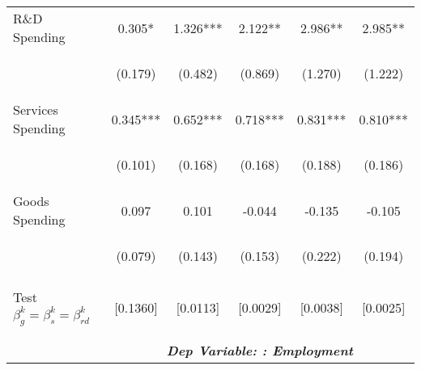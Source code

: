 \begin{tabular}{lccccc}
    R\&D Spending & 0.305* & 1.326*** & 2.122** & 2.986** & 2.985** \\
     & \begin{footnotesize}(0.179)\end{footnotesize} & \begin{footnotesize}(0.482)\end{footnotesize} & \begin{footnotesize}(0.869)\end{footnotesize} & \begin{footnotesize}(1.270)\end{footnotesize} & \begin{footnotesize}(1.222)\end{footnotesize} \\
    Services Spending & 0.345*** & 0.652*** & 0.718*** & 0.831*** & 0.810*** \\
     & \begin{footnotesize}(0.101)\end{footnotesize} & \begin{footnotesize}(0.168)\end{footnotesize} & \begin{footnotesize}(0.168)\end{footnotesize} & \begin{footnotesize}(0.188)\end{footnotesize} & \begin{footnotesize}(0.186)\end{footnotesize} \\
    Goods Spending & 0.097 & 0.101 & -0.044 & -0.135 & -0.105 \\
     & \begin{footnotesize}(0.079)\end{footnotesize} & \begin{footnotesize}(0.143)\end{footnotesize} & \begin{footnotesize}(0.153)\end{footnotesize} & \begin{footnotesize}(0.222)\end{footnotesize} & \begin{footnotesize}(0.194)\end{footnotesize} \\
   \\
   Test $\beta^k_g=\beta^k_s=\beta^k_{rd}$  &  [0.1360]  & [0.0113] & [0.0029] & [0.0038] & [0.0025] \\
   \\
    \hline
    \vspace{-2pt} & \vspace{-2pt} & \vspace{-2pt} & \vspace{-2pt} & \vspace{-2pt} \\
    & \multicolumn{5}{c}{\textit{\textbf{Dep Variable: : Employment}}} \\ 
    \cmidrule{2-6}
    

\end{tabular}
